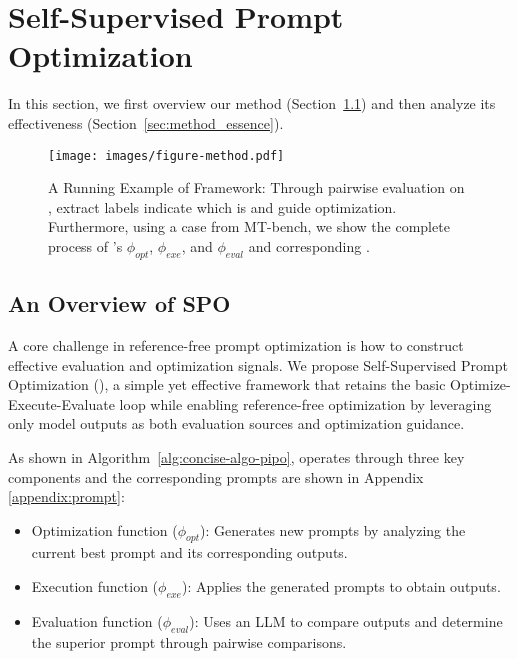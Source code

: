\section{Self-Supervised Prompt Optimization}
\label{sec:method}

In this section, we first overview our method (Section~\ref{sub:overview}) and then analyze its effectiveness (Section~\ref{sec:method_essence}).

\begin{figure*}[t!]
  \centering
\texttt{[image: images/figure-method.pdf]}
  \vspace{-2em}
  \caption{A Running Example of \ours Framework: Through pairwise evaluation on , \ours extract labels indicate which  is  and guide optimization. Furthermore, using a case from MT-bench, we show the complete process of \ours's $\phi_{opt}$, $\phi_{exe}$, and $\phi_{eval}$ and corresponding .}
  \label{fig:main_method}
  \vspace{-1em}
\end{figure*}

\subsection{An Overview of SPO}
\label{sub:overview}

A core challenge in reference-free prompt optimization is how to construct effective evaluation and optimization signals. We propose Self-Supervised Prompt Optimization (\ours), a simple yet effective framework that retains the basic Optimize-Execute-Evaluate loop while enabling reference-free optimization by leveraging only model outputs as both evaluation sources and optimization guidance.

As shown in Algorithm~\ref{alg:concise-algo-pipo}, \ours operates through three key components and the corresponding prompts are shown in Appendix \ref{appendix:prompt}: 

\begin{itemize}
\item Optimization function ($\phi_{opt}$): Generates new prompts by analyzing the current best prompt and its corresponding outputs.
\item Execution function ($\phi_{exe}$): Applies the generated prompts to obtain outputs.
\item Evaluation function ($\phi_{eval}$): Uses an LLM to compare outputs and determine the superior prompt through pairwise comparisons.
\end{itemize}

